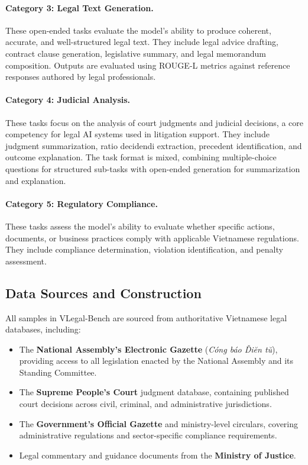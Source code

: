 \documentclass[11pt,a4paper]{article}
\newcommand{\system}{VLegal-Bench}
\newcommand{\rougel}{ROUGE-L}
\begin{document}
\paragraph{Category 3: Legal Text Generation.}
These open-ended tasks evaluate the model's ability to produce coherent, accurate, and well-structured legal text.
They include legal advice drafting, contract clause generation, legislative summary, and legal memorandum composition.
Outputs are evaluated using \rougel{} metrics against reference responses authored by legal professionals.

\paragraph{Category 4: Judicial Analysis.}
These tasks focus on the analysis of court judgments and judicial decisions, a core competency for legal AI systems used in litigation support.
They include judgment summarization, ratio decidendi extraction, precedent identification, and outcome explanation.
The task format is mixed, combining multiple-choice questions for structured sub-tasks with open-ended generation for summarization and explanation.

\paragraph{Category 5: Regulatory Compliance.}
These tasks assess the model's ability to evaluate whether specific actions, documents, or business practices comply with applicable Vietnamese regulations.
They include compliance determination, violation identification, and penalty assessment.

\subsection{Data Sources and Construction}

All samples in \system{} are sourced from authoritative Vietnamese legal databases, including:

\begin{itemize}[leftmargin=*, itemsep=2pt]
    \item The \textbf{National Assembly's Electronic Gazette} (\emph{C\'{o}ng b\'{a}o \v{D}i\u{e}n t\u{u}}), providing access to all legislation enacted by the National Assembly and its Standing Committee.
    \item The \textbf{Supreme People's Court} judgment database, containing published court decisions across civil, criminal, and administrative jurisdictions.
    \item The \textbf{Government's Official Gazette} and ministry-level circulars, covering administrative regulations and sector-specific compliance requirements.
    \item Legal commentary and guidance documents from the \textbf{Ministry of Justice}.
\end{itemize}
\end{document}
